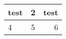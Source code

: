 \documentclass{article}
\begin{document}
\begin{tabular}{ l | c | r }
    \hline 
test & 2 & test \\
\hline 
4 & 5 & 6 \\
\hline 
\end{tabular}
\end{document}

